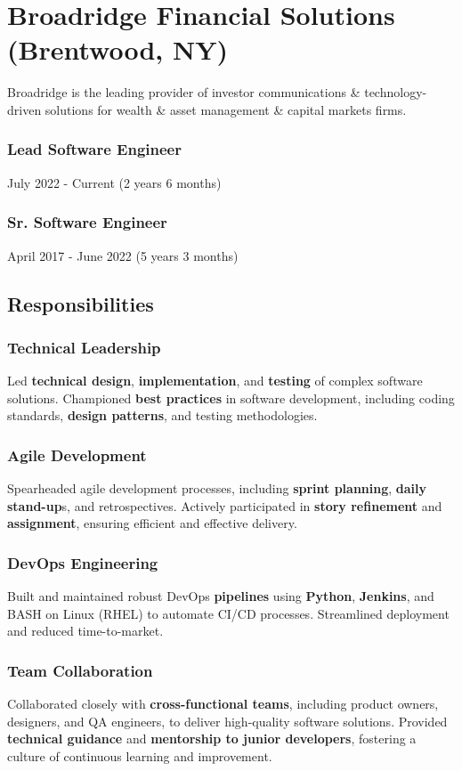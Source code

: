 \documentclass[letterpaper,9pt]{article}
\begin{document}
    \section{Broadridge Financial Solutions (Brentwood, NY)}{
    	Broadridge is the leading provider of investor communications \& technology-driven solutions for wealth \& asset management \& capital markets firms.}    
    \subsubsection{Lead Software Engineer}{July 2022 - Current (2 years 6 months)}
    \subsubsection{Sr. Software Engineer}{April 2017 - June 2022 (5 years 3 months)}
    \subsection{Responsibilities}
	\subsubsection{Technical Leadership}{Led \textbf{technical design}, \textbf{implementation}, and \textbf{testing} of complex software solutions. Championed \textbf{best practices} in software development, including coding standards, \textbf{design patterns}, and testing methodologies.}
	\subsubsection{Agile Development}{Spearheaded agile development processes, including \textbf{sprint planning}, \textbf{daily stand-up}s, and retrospectives. Actively participated in \textbf{story refinement} and \textbf{assignment}, ensuring efficient and effective delivery.}
	\subsubsection{DevOps Engineering}{Built and maintained robust DevOps \textbf{pipelines} using \textbf{Python}, \textbf{Jenkins}, and BASH on Linux (RHEL) to automate CI/CD processes. Streamlined deployment and reduced time-to-market.}
	\subsubsection{Team Collaboration}{Collaborated closely with \textbf{cross-functional teams}, including product owners, designers, and QA engineers, to deliver high-quality software solutions. Provided \textbf{technical guidance} and \textbf{mentorship to junior developers}, fostering a culture of continuous learning and improvement.}
\end{document}
